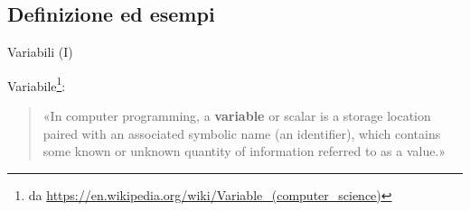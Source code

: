 \subsection[Definizione ed esempi]{Definizione ed esempi}

\begin{frame}{Variabili (I)}

  Variabile\footnote{da \url{https://en.wikipedia.org/wiki/Variable_(computer_science)}}:
  \begin{quote}
    «In computer programming, a \textbf{variable} or scalar is a \alert<2->{storage location}
     paired with an \alert<3->{associated symbolic name (an identifier)}, which contains some
     known or unknown quantity of information referred to as a \alert<4->{value}.»
  \end{quote}

\end{frame}

